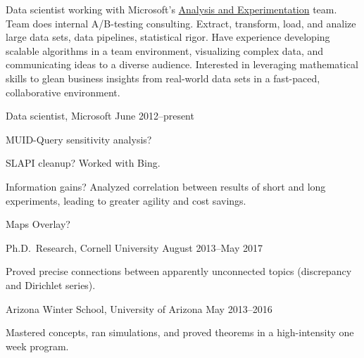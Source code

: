 \documentclass[11pt, letterpaper]{awesome-cv}
\begin{document}
\makecvheader






\begin{cvparagraph}
Data scientist working with Microsoft's \href{http://www.exp-platform.com/Pages/default.aspx}{Analysis and Experimentation} team. 
Team does internal A/B-testing consulting. 
Extract, transform, load, and analize large data sets, data pipelines, statistical rigor. 
Have experience developing scalable algorithms in a team environment, visualizing complex data, and communicating ideas to a diverse audience.
Interested in leveraging mathematical skills to glean business insights from real-world data sets in a fast-paced, collaborative environment. 
\end{cvparagraph}






\begin{cventries}

\cventry
	{Data scientist, Microsoft}
	{}{}
	{June 2012--present}
	{
		\begin{cvitems}
			\item{MUID-Query sensitivity analysis?}
			\item{SLAPI cleanup? Worked with Bing.}
			\item{Information gains? Analyzed correlation between results of short and long experiments, leading to greater agility and cost savings.}
			\item{Maps Overlay?}
		\end{cvitems}
	}

\cventry
	{Ph.D.~Research, Cornell University}
	{}{}
	{August 2013--May 2017}
	{
		\begin{cvitems}
			\item{Proved precise connections between apparently unconnected topics (discrepancy and Dirichlet series).}
		\end{cvitems}
	}
		
\cventry
	{Arizona Winter School, University of Arizona}
	{}{}
	{May 2013--2016}
	{
		\begin{cvitems}
			\item{Mastered concepts, ran simulations, and proved theorems in a high-intensity one week program.}
		\end{cvitems}
	}
\end{cventries}
\end{document}
